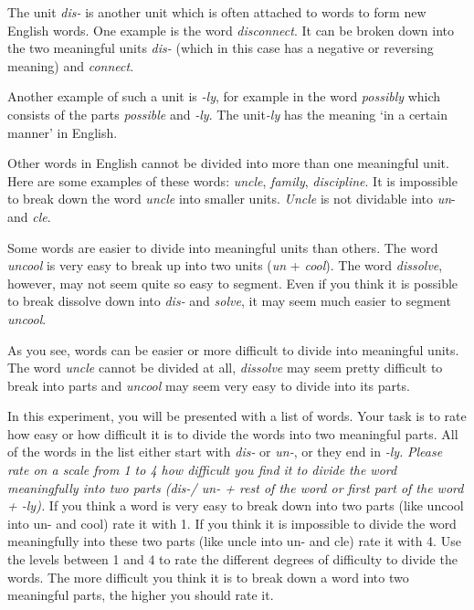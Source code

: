 The unit \textit{dis-} is another unit which is often attached to words to form new English words. One example is the word \textit{disconnect}. It can be broken down into the two meaningful units \textit{{dis-} }(which in this case has a negative or reversing meaning) and \textit{connect}.

Another example of such a unit is \textit{-ly}, for example in the word \textit{possibly} which consists of the parts \textit{possible} and \textit{-ly}.  The unit\textit{-ly} has the meaning `in a certain manner' in English.

Other words in English cannot be divided into more than one meaningful unit. Here are some examples of these words: \textit{uncle}, \textit{family}, \textit{discipline}. It is impossible to break down the word \textit{uncle} into smaller units. \textit{Uncle} is not dividable into \textit{un}- and \textit{cle}.

Some words are easier to divide into meaningful units than others. The word \textit{uncool} is very easy to break up into two units (\textit{un} + \textit{cool}). The word \textit{dissolve}, however, may not seem quite so easy to segment. Even if you think it is possible to break dissolve down into \textit{dis-} and \textit{solve}, it may seem much easier to segment \textit{uncool}.

As you see, words can be easier or more difficult to divide into meaningful units. The word \textit{uncle} cannot be divided at all, \textit{dissolve} may seem pretty difficult to break into parts and \textit{uncool} may seem very easy to divide into its parts. 

In this experiment, you will be presented with a list of words. Your task is to rate how easy or how difficult it is to divide the words into two meaningful parts. All of the words in the list either start with \textit{dis-} or \textit{un-}, or they end in \textit{{-ly}.} \emph{Please rate on a scale from 1 to 4 how difficult you find it to divide the word meaningfully into two parts (\textit{{dis-}/ un-} + rest of the word or first part of the word + \textit{-ly}).} If you think a word is very easy to break down into two parts (like uncool into {un-} and cool) rate it with 1.  If you think it is impossible to divide the word meaningfully into these two parts (like uncle into {un-} and cle) rate it with 4. Use the levels between 1 and 4 to rate the different degrees of difficulty to divide the words. The more difficult you think it is to break down a word into two meaningful parts, the higher you should rate it.

